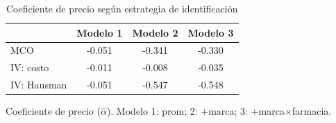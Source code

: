 \begin{table}[H]
\centering
\caption{Coeficiente de precio seg\'un estrategia de identificaci\'on}
\begin{tabular}{lccc}
\toprule
& Modelo 1 & Modelo 2 & Modelo 3 \\
\midrule
MCO & -0.051 & -0.341 & -0.330 \\
IV: costo & -0.011 & -0.008 & -0.035 \\
IV: Hausman & -0.051 & -0.547 & -0.548 \\
\bottomrule
\end{tabular}

\smallskip
{\footnotesize\begin{minipage}{0.92\linewidth}Coeficiente de precio ($\hat{\alpha}$). Modelo 1: prom; 2: +marca; 3: +marca$\times$farmacia.\end{minipage}}
\end{table}
